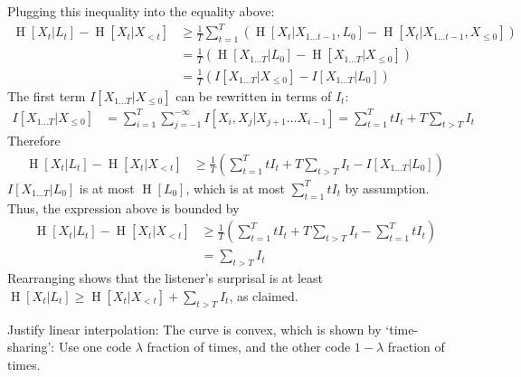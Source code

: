 \documentclass[11pt,letterpaper]{article}
\begin{document}
	Plugging this inequality into the equality above:
\begin{align*}
	\operatorname{H}[X_t | L_t] - \operatorname{H}[X_t | X_{<t}]& \geq \frac{1}{T} \sum_{t=1}^T ( \operatorname{H}[X_t|X_{1\dots t-1}, L_0] - \operatorname{H}[X_t | X_{1\dots t-1}, X_{\leq 0}]  )    \\
	& = \frac{1}{T} \left(\operatorname{H}[X_{1\dots T} | L_0] - \operatorname{H}[X_{1\dots T} | X_{\leq 0}]\right)  \\
	& = \frac{1}{T} \left(I[X_{1\dots T}|X_{\leq 0}] - I[X_{1\dots T}|L_0]\right) 
\end{align*}
	The first term $I[X_{1\dots T}|X_{\leq 0}]$ can be rewritten in terms of $I_t$:
	\begin{align*}
		I[X_{1\dots T}|X_{\leq 0}] &= \sum_{i=1}^T \sum_{j=-1}^{-\infty} I[X_i, X_j | X_{j+1}...X_{i-1}] = \sum_{t=1}^T t I_t + T \sum_{t > T} I_t
	\end{align*}
	Therefore
\begin{align*}
	\operatorname{H}[X_t | L_t] - \operatorname{H}[X_t | X_{<t}]& \geq \frac{1}{T} \left(\sum_{t=1}^T t I_t + T \sum_{t > T} I_t - I[X_{1\dots T}|L_0]\right) 
\end{align*}
	$I[X_{1\dots T}|L_0]$ is at most $\operatorname{H}[L_0]$, which is at most $\sum_{t=1}^T t I_t$ by assumption. Thus, the expression above is bounded by
	\begin{align*}
	\operatorname{H}[X_t | L_t] - \operatorname{H}[X_t | X_{<t}]& \geq \frac{1}{T} \left(\sum_{t=1}^T t I_t + T \sum_{t > T} I_t - \sum_{t=1}^T t I_t\right) \\
		&= \sum_{t > T} I_t
\end{align*}
	Rearranging shows that the listener's surprisal is at least $\operatorname{H}[X_t|L_t] \geq \operatorname{H}[X_t | X_{<t}] + \sum_{t > T} I_t$, as claimed.


Justify linear interpolation: The curve is convex, which is shown by `time-sharing': Use one code $\lambda$ fraction of times, and the other code $1-\lambda$ fraction of times.
\end{document}
